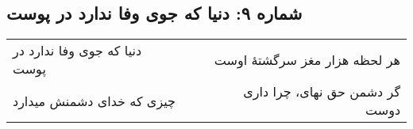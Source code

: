 \begin{center}
\section*{شماره ۹: دنیا که جوی وفا ندارد در پوست}
\label{sec:009}
\begin{longtable}{l p{0.5cm} r}
دنیا که جوی وفا ندارد در پوست
&&
هر لحظه هزار مغز سرگشتهٔ اوست
\\
چیزی که خدای دشمنش میدارد
&&
گر دشمن حق نهای، چرا داری دوست
\\
\end{longtable}
\end{center}
